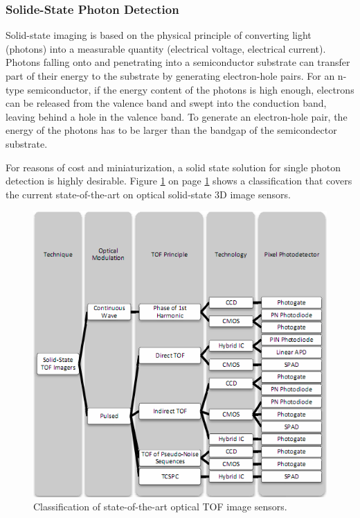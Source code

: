 \subsubsection{Solide-State Photon Detection}
\label{ssphotonsensing}
Solid-state imaging is based on the physical principle of converting light (photons) into a measurable quantity (electrical voltage, electrical current). Photons falling onto and penetrating into a semiconductor substrate can transfer part of their energy to the substrate by generating electron-hole pairs. For an n-type semiconductor, if the energy content of the photons is high enough, electrons can be released from the valence band and swept into the conduction band, leaving behind a hole in the valence band. To generate an electron-hole pair, the energy of the photons has to be larger than the bandgap of the semicondector substrate.

For reasons of cost and miniaturization, a solid state solution for single photon detection is highly desirable. Figure \ref{fig:intro_receiver1} on page \ref{fig:intro_receiver1} shows a classification that covers the current state-of-the-art on optical solid-state 3D image sensors. 

\begin{figure}
\centering
\includegraphics[scale = 1]{chapters/img/intro_receiver1.png}
\caption{Classification of state-of-the-art optical TOF image sensors.}
\label{fig:intro_receiver1}
\end{figure}

